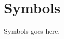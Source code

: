 \chapter*{\centering Symbols}
\begin{spacing}{1.5}
\setlength{\parskip}{0.3in}
\thispagestyle{addin}

Symbols goes here.
\end{spacing}
\newpage
